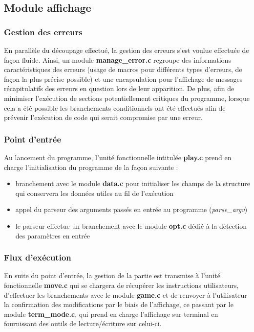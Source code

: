 \documentclass{report}
\begin{document}
\subsection{Module affichage}
\subsubsection*{Gestion des erreurs}
En parallèle du découpage effectué, la gestion des erreurs s'est voulue effectuée de façon fluide. Ainsi, un module \textbf{manage\_error.c} regroupe des informations caractéristiques des erreurs (usage de macros pour différents types d'erreurs, de façon la plus précise possible) et une encapsulation pour l'affichage de messages récapitulatifs des erreurs en question lors de leur apparition.
De plus, afin de minimiser l'exécution de sections potentiellement critiques du programme, lorsque cela a été possible les branchements conditionnels ont été effectués afin de prévenir l'exécution de code qui serait compromise par une erreur.
\subsubsection*{Point d'entrée}
Au lancement du programme, l'unité fonctionnelle intitulée \textbf{play.c} prend en charge l'initialisation du programme de la façon suivante :
\begin{itemize}
\item branchement avec le module \textbf{data.c} pour initialiser les champs de la structure qui conservera les données utiles au fil de l'exécution
\item appel du parseur des arguments passés en entrée au programme (\textit{parse\_argv})
\item le parseur effectue un branchement avec le module \textbf{opt.c} dédié à la détection des paramètres en entrée
\end{itemize}
\subsubsection*{Flux d'exécution}
En suite du point d'entrée, la gestion de la partie est transmise à l'unité fonctionnelle \textbf{move.c} qui se chargera de récupérer les instructions utilisateurs, d'effectuer les branchements avec le module \textbf{game.c} et de renvoyer à l'utilisateur la confirmation des modifications par le biais de l'affichage, ce passant par le module \textbf{term\_mode.c}, qui prend en charge l'affichage sur terminal en fournissant des outils de lecture/écriture sur celui-ci.
\end{document}
